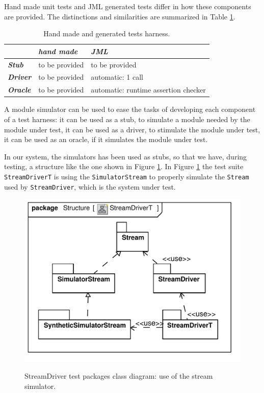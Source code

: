 \documentclass{article} \usepackage{times}
\newcommand{\lil}[1]{\texttt{\lstinline|#1|}}
\begin{document}
Hand made unit tests and JML generated tests differ in how these
components are provided.  The distinctions and similarities are
summarized in Table \ref{tab:test_harness}.

\begin{table}[htbp]
  \caption{Hand made and generated tests harness.}
  \label{tab:test_harness}
  \begin{center}
    \begin{tabular}{|l|l|l|}\hline
      & \textbf{\textit{hand made}} & \textbf{\textit{JML}} \\\hline
      \textbf{\textit{Stub}} & to be provided & to be provided\\\hline
      \textbf{\textit{Driver}} & to be provided & automatic: 1 call\\\hline
      \textbf{\textit{Oracle}} & to be provided & 
      automatic: runtime assertion checker\\\hline
    \end{tabular}
  \end{center}
\end{table}

A module simulator can be used to ease the tasks of developing each
component of a test harness: it can be used as a stub, to simulate a
module needed by the module under test, it can be used as a driver, to
stimulate the module under test, it can be used as an oracle, if it
simulates the module under test.

In our system, the simulators has been used as stubs, so that we have,
during testing, a structure like the one shown in Figure
\ref{fig:class_diagram_streamdriver_test}.  In Figure
\ref{fig:class_diagram_streamdriver_test} the test suite
\lil{StreamDriverT} is using the \lil{SimulatorStream} to properly
simulate the \lil{Stream} used by \lil{StreamDriver}, which is the
system under test.

\begin{figure}[htb!]
  \centering
  \includegraphics[scale=0.4]{UML_model/Class_Diagram__Structure__StreamDriverT}
  \label{fig:class_diagram_streamdriver_test}
  \caption{StreamDriver test packages class diagram: use of the stream
    simulator.}
\end{figure}
\end{document}
